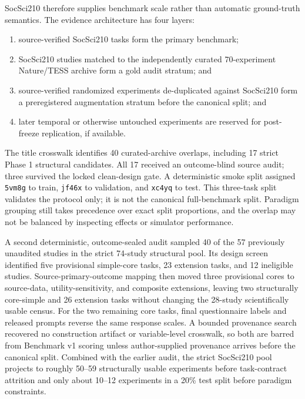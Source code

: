 \documentclass[11pt]{article}
\begin{document}
SocSci210 therefore supplies benchmark scale rather than automatic ground-truth semantics. The evidence architecture has four layers:

\begin{enumerate}
\item source-verified SocSci210 tasks form the primary benchmark;
\item SocSci210 studies matched to the independently curated 70-experiment Nature/TESS archive form a gold audit stratum; and
\item source-verified randomized experiments de-duplicated against SocSci210 form a preregistered augmentation stratum before the canonical split; and
\item later temporal or otherwise untouched experiments are reserved for post-freeze replication, if available.
\end{enumerate}

The title crosswalk identifies 40 curated-archive overlaps, including 17 strict Phase 1 structural candidates. All 17 received an outcome-blind source audit; three survived the locked clean-design gate. A deterministic smoke split assigned \texttt{5vm8g} to train, \texttt{jf46x} to validation, and \texttt{xc4yq} to test. This three-task split validates the protocol only; it is not the canonical full-benchmark split. Paradigm grouping still takes precedence over exact split proportions, and the overlap may not be balanced by inspecting effects or simulator performance.

A second deterministic, outcome-sealed audit sampled 40 of the 57 previously unaudited studies in the strict 74-study structural pool. Its design screen identified five provisional simple-core tasks, 23 extension tasks, and 12 ineligible studies. Source-primary-outcome mapping then moved three provisional cores to source-data, utility-sensitivity, and composite extensions, leaving two structurally core-simple and 26 extension tasks without changing the 28-study scientifically usable census. For the two remaining core tasks, final questionnaire labels and released prompts reverse the same response scales. A bounded provenance search recovered no construction artifact or variable-level crosswalk, so both are barred from Benchmark v1 scoring unless author-supplied provenance arrives before the canonical split. Combined with the earlier audit, the strict SocSci210 pool projects to roughly 50--59 structurally usable experiments before task-contract attrition and only about 10--12 experiments in a 20\% test split before paradigm constraints.
\end{document}
